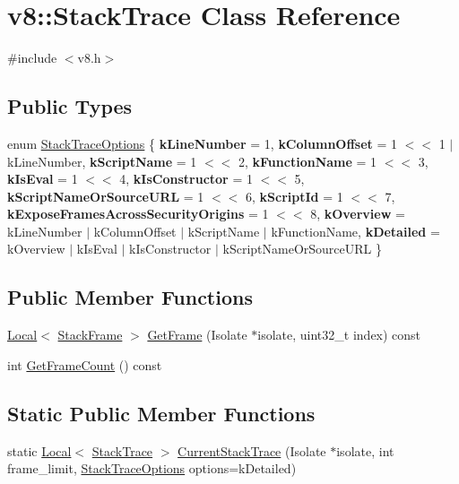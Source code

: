 \hypertarget{classv8_1_1StackTrace}{}\section{v8\+:\+:Stack\+Trace Class Reference}
\label{classv8_1_1StackTrace}


{\ttfamily \#include $<$v8.\+h$>$}

\subsection*{Public Types}
\begin{DoxyCompactItemize}
\item 
enum \mbox{\hyperlink{classv8_1_1StackTrace_a9704e4a37949eb8eb8ccddbddf161492}{Stack\+Trace\+Options}} \{ \newline
{\bfseries k\+Line\+Number} = 1, 
{\bfseries k\+Column\+Offset} = 1 $<$$<$ 1 $\vert$ k\+Line\+Number, 
{\bfseries k\+Script\+Name} = 1 $<$$<$ 2, 
{\bfseries k\+Function\+Name} = 1 $<$$<$ 3, 
\newline
{\bfseries k\+Is\+Eval} = 1 $<$$<$ 4, 
{\bfseries k\+Is\+Constructor} = 1 $<$$<$ 5, 
{\bfseries k\+Script\+Name\+Or\+Source\+U\+RL} = 1 $<$$<$ 6, 
{\bfseries k\+Script\+Id} = 1 $<$$<$ 7, 
\newline
{\bfseries k\+Expose\+Frames\+Across\+Security\+Origins} = 1 $<$$<$ 8, 
{\bfseries k\+Overview} = k\+Line\+Number $\vert$ k\+Column\+Offset $\vert$ k\+Script\+Name $\vert$ k\+Function\+Name, 
{\bfseries k\+Detailed} = k\+Overview $\vert$ k\+Is\+Eval $\vert$ k\+Is\+Constructor $\vert$ k\+Script\+Name\+Or\+Source\+U\+RL
 \}
\end{DoxyCompactItemize}
\subsection*{Public Member Functions}
\begin{DoxyCompactItemize}
\item 
\mbox{\hyperlink{classv8_1_1Local}{Local}}$<$ \mbox{\hyperlink{classv8_1_1StackFrame}{Stack\+Frame}} $>$ \mbox{\hyperlink{classv8_1_1StackTrace_a62d9e32ccc7706716de7c7fd66a18726}{Get\+Frame}} (Isolate $\ast$isolate, uint32\+\_\+t index) const
\item 
int \mbox{\hyperlink{classv8_1_1StackTrace_a97a2010fa998f963df290062a8157849}{Get\+Frame\+Count}} () const
\end{DoxyCompactItemize}
\subsection*{Static Public Member Functions}
\begin{DoxyCompactItemize}
\item 
static \mbox{\hyperlink{classv8_1_1Local}{Local}}$<$ \mbox{\hyperlink{classv8_1_1StackTrace}{Stack\+Trace}} $>$ \mbox{\hyperlink{classv8_1_1StackTrace_a9ae3595dfa217d50a60cea7ea2e87366}{Current\+Stack\+Trace}} (Isolate $\ast$isolate, int frame\+\_\+limit, \mbox{\hyperlink{classv8_1_1StackTrace_a9704e4a37949eb8eb8ccddbddf161492}{Stack\+Trace\+Options}} options=k\+Detailed)
\end{DoxyCompactItemize}


